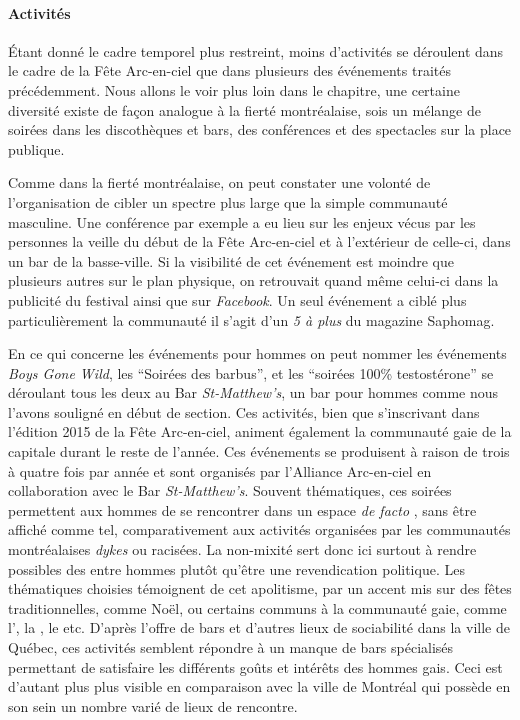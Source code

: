 \paragraph{Activités}
\label{subsec:activitesfetearcenciel}
Étant donné le cadre temporel plus restreint, moins d'activités se déroulent dans le cadre de la Fête Arc-en-ciel que dans plusieurs des événements traités précédemment.
Nous allons le voir plus loin dans le chapitre, une certaine diversité existe de façon analogue à la fierté montréalaise, sois un mélange de soirées dans les discothèques et bars, des conférences et des spectacles sur la place publique.

Comme dans la fierté montréalaise, on peut constater une volonté de l'organisation de cibler un spectre plus large que la simple communauté  masculine.
Une conférence par exemple a eu lieu sur les enjeux vécus par les personnes  la veille du début de la Fête Arc-en-ciel et à l'extérieur de celle-ci, dans un bar de la basse-ville.
Si la visibilité de cet événement est moindre que plusieurs autres sur le plan physique, on retrouvait quand même celui-ci dans la publicité du festival ainsi que sur \emph{Facebook}.
Un seul événement a ciblé plus particulièrement la communauté  il s'agit d'un \emph{5 à plus} du magazine Saphomag.

En ce qui concerne les événements pour hommes  on peut nommer les événements \emph{Boys Gone Wild}, les \enquote{Soirées des barbus}, et les \enquote{soirées 100\% testostérone} se déroulant tous les deux au Bar \emph{St-Matthew's}, un bar pour hommes comme nous l'avons souligné en début de section.
Ces activités, bien que s'inscrivant dans l'édition 2015 de la Fête Arc-en-ciel, animent également la communauté gaie de la capitale durant le reste de l'année.
Ces événements se produisent à raison de trois à quatre fois par année et sont organisés par l'Alliance Arc-en-ciel en collaboration avec le Bar \emph{St-Matthew's}.
Souvent thématiques, ces soirées permettent aux hommes de se rencontrer dans un espace \emph{de facto} , sans être affiché comme tel, comparativement aux activités organisées par les communautés montréalaises \emph{dykes} ou racisées.
La non-mixité sert donc ici surtout à rendre possibles des  entre hommes plutôt qu'être une revendication politique.
Les thématiques choisies témoignent de cet apolitisme, par un accent mis sur des fêtes traditionnelles, comme Noël, ou certains  communs à la communauté gaie, comme l', la , le  etc.
D'après l'offre de bars et d'autres lieux de sociabilité dans la ville de Québec, ces activités semblent répondre à un manque de bars spécialisés permettant de satisfaire les différents goûts et intérêts des hommes gais.
Ceci est d'autant plus plus visible en comparaison avec la ville de Montréal qui possède en son sein un nombre varié de lieux de rencontre.

